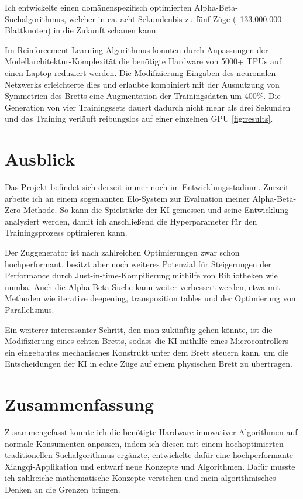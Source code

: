 \documentclass[
  manuscript=article,  %
  layout=publish,  %
  year=2023,
  volume=1,
]{extra/joas}
\begin{document}
Ich entwickelte einen domänenspezifisch optimierten Alpha-Beta-Suchalgorithmus, welcher in ca. acht Sekundenbis zu fünf Züge (~133.000.000 Blattknoten) in die Zukunft schauen kann.

Im Reinforcement Learning Algorithmus konnten durch Anpassungen der Modellarchitektur-Komplexität die benötigte Hardware von 5000+ TPUs auf einen Laptop reduziert werden. Die Modifizierung Eingaben des neuronalen Netzwerks erleichterte dies und erlaubte kombiniert mit der Ausnutzung von Symmetrien des Bretts eine Augmentation der Trainingsdaten um 400\%. Die Generation von vier Trainingssets dauert dadurch nicht mehr als drei Sekunden und das Training verläuft reibungslos auf einer einzelnen GPU \ref{fig:results}.

\section{Ausblick}
Das Projekt befindet sich derzeit immer noch im Entwicklungsstadium. Zurzeit arbeite ich an einem sogenannten Elo-System zur Evaluation meiner Alpha-Beta-Zero Methode. So kann die Spielstärke der KI gemessen und seine Entwicklung analysiert werden, damit ich anschließend die Hyperparameter für den Trainingsprozess optimieren kann.

Der Zuggenerator ist nach zahlreichen Optimierungen zwar schon hochperformant, besitzt aber noch weiteres Potenzial für Steigerungen der Performance durch Just-in-time-Kompilierung mithilfe von Bibliotheken wie numba. Auch die Alpha-Beta-Suche kann weiter verbessert werden, etwa mit Methoden wie iterative deepening, transposition tables und der Optimierung vom Parallelismus.

Ein weiterer interessanter Schritt, den man zukünftig gehen könnte, ist die Modifizierung eines echten Bretts, sodass die KI mithilfe eines Microcontrollers ein eingebautes mechanisches Konstrukt unter dem Brett steuern kann, um die Entscheidungen der KI in echte Züge auf einem physischen Brett zu übertragen.

\section{Zusammenfassung}
Zusammengefasst konnte ich die benötigte Hardware innovativer Algorithmen auf normale Konsumenten anpassen, indem ich diesen mit einem hochoptimierten traditionellen Suchalgorithmus ergänzte, entwickelte dafür eine hochperformante Xiangqi-Applikation und entwarf neue Konzepte und Algorithmen. Dafür musste ich zahlreiche mathematische Konzepte verstehen und mein algorithmisches Denken an die Grenzen bringen. 
\end{document}
